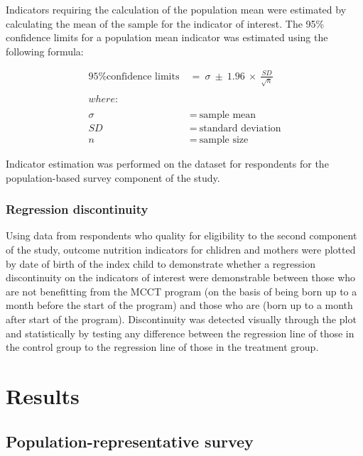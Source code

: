 \documentclass[12pt,a4paper]{article}
\begin{document}
Indicators requiring the calculation of the population mean were estimated by calculating the mean of the sample for the indicator of interest. The 95\% confidence limits for a population mean indicator was estimated using the following formula:

\[
\begin{aligned}
\text{95\% confidence limits} & ~ = ~ \sigma ~ \pm ~ 1.96 ~ \times ~ \frac{SD}{\sqrt{n}} \\
\\
where: & \\
\\
\sigma & ~ = ~ \text{sample mean} \\
SD & ~ = ~ \text{standard deviation} \\
n & ~ = ~ \text{sample size}
\end{aligned}
\]

Indicator estimation was performed on the dataset for respondents for the population-based survey component of the study.

\hypertarget{regression-discontinuity}{%
\subsubsection{Regression discontinuity}\label{regression-discontinuity}}

Using data from respondents who quality for eligibility to the second component of the study, outcome nutrition indicators for chlidren and mothers were plotted by date of birth of the index child to demonstrate whether a regression discontinuity on the indicators of interest were demonstrable between those who are not benefitting from the MCCT program (on the basis of being born up to a month before the start of the program) and those who are (born up to a month after start of the program). Discontinuity was detected visually through the plot and statistically by testing any difference between the regression line of those in the control group to the regression line of those in the treatment group.

\hypertarget{results}{%
\section{Results}\label{results}}

\hypertarget{study1-results}{%
\subsection{Population-representative survey}\label{study1-results}}
\end{document}

